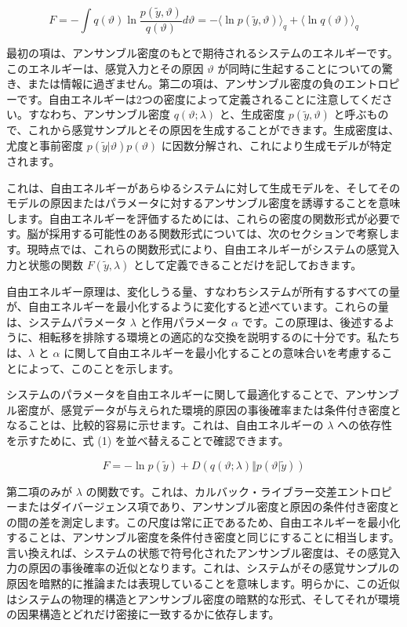 \documentclass{article}
\begin{document}
$$F = -\int q(\vartheta)\ln\frac{p(\tilde{y},\vartheta)}{q(\vartheta)}d\vartheta = -\langle\ln p(\tilde{y},\vartheta)\rangle_q+\langle\ln q(\vartheta)\rangle_q$$

最初の項は、アンサンブル密度のもとで期待されるシステムのエネルギーです。このエネルギーは、感覚入力とその原因 $\vartheta$ が同時に生起することについての驚き、または情報に過ぎません。第二の項は、アンサンブル密度の負のエントロピーです。自由エネルギーは2つの密度によって定義されることに注意してください。すなわち、アンサンブル密度 $q(\vartheta; \lambda)$ と、生成密度 $p(\tilde{y},\vartheta)$ と呼ぶもので、これから感覚サンプルとその原因を生成することができます。生成密度は、尤度と事前密度 $p(\tilde{y}|\vartheta)p(\vartheta)$ に因数分解され、これにより生成モデルが特定されます。

これは、自由エネルギーがあらゆるシステムに対して生成モデルを、そしてそのモデルの原因またはパラメータに対するアンサンブル密度を誘導することを意味します。自由エネルギーを評価するためには、これらの密度の関数形式が必要です。脳が採用する可能性のある関数形式については、次のセクションで考察します。現時点では、これらの関数形式により、自由エネルギーがシステムの感覚入力と状態の関数 $F(\tilde{y},\lambda)$ として定義できることだけを記しておきます。

自由エネルギー原理は、変化しうる量、すなわちシステムが所有するすべての量が、自由エネルギーを最小化するように変化すると述べています。これらの量は、システムパラメータ $\lambda$ と作用パラメータ $\alpha$ です。この原理は、後述するように、相転移を排除する環境との適応的な交換を説明するのに十分です。私たちは、$\lambda$ と $\alpha$ に関して自由エネルギーを最小化することの意味合いを考慮することによって、このことを示します。

システムのパラメータを自由エネルギーに関して最適化することで、アンサンブル密度が、感覚データが与えられた環境的原因の事後確率または条件付き密度となることは、比較的容易に示せます。これは、自由エネルギーの $\lambda$ への依存性を示すために、式 (1) を並べ替えることで確認できます。

$$F = -\ln p(\tilde{y})+D(q(\vartheta;\lambda)\Vert p(\vartheta |\tilde{y}))$$

第二項のみが $\lambda$ の関数です。これは、カルバック・ライブラー交差エントロピーまたはダイバージェンス項であり、アンサンブル密度と原因の条件付き密度との間の差を測定します。この尺度は常に正であるため、自由エネルギーを最小化することは、アンサンブル密度を条件付き密度と同じにすることに相当します。言い換えれば、システムの状態で符号化されたアンサンブル密度は、その感覚入力の原因の事後確率の近似となります。これは、システムがその感覚サンプルの原因を暗黙的に推論または表現していることを意味します。明らかに、この近似はシステムの物理的構造とアンサンブル密度の暗黙的な形式、そしてそれが環境の因果構造とどれだけ密接に一致するかに依存します。
\end{document}
